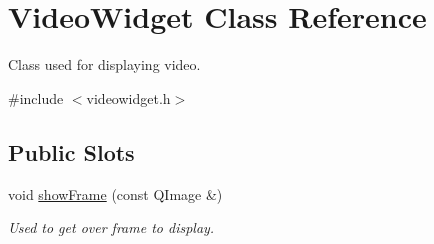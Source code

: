 \hypertarget{class_video_widget}{
\section{VideoWidget Class Reference}
\label{db/df7/class_video_widget}
}


Class used for displaying video.  




{\ttfamily \#include $<$videowidget.h$>$}

\subsection*{Public Slots}
\begin{DoxyCompactItemize}
\item 
void \hyperlink{class_video_widget_af99b87e3779f8a55473941540e84bdf2}{showFrame} (const QImage \&)
\begin{DoxyCompactList}\small\item\em Used to get over frame to display. \item\end{DoxyCompactList}\end{DoxyCompactItemize}

